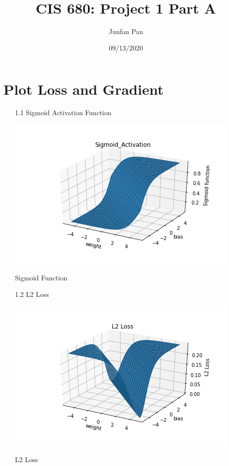 \documentclass{article}
\title{CIS 680: Project 1 Part A}
\author{Junfan Pan}
\date{09/13/2020}
\begin{document}
    \maketitle
    
    \section{Plot Loss and Gradient}
    \noindent
    \begin{enumerate}
    	\item[1.1] 
    	Sigmoid Activation Function\\
    	\begin{minipage}[t]{\linewidth}
        	\captionsetup{type=figure}
            \centering
            \includegraphics[width=0.65\linewidth]{Sigmoid_Activation.png}
            \caption{Sigmoid Function}
            \label{fig: Sigmoid Function}  
        \end{minipage}
        
        \item[1.2] 
    	L2 Loss\\
    	\begin{minipage}[t]{\linewidth}
        	\captionsetup{type=figure}
            \centering
            \includegraphics[width=0.65\linewidth]{L2 Loss.png}
            \caption{L2 Loss} 
            \label{L2 Loss}    
        \end{minipage}
        

\end{enumerate}
\end{document}
